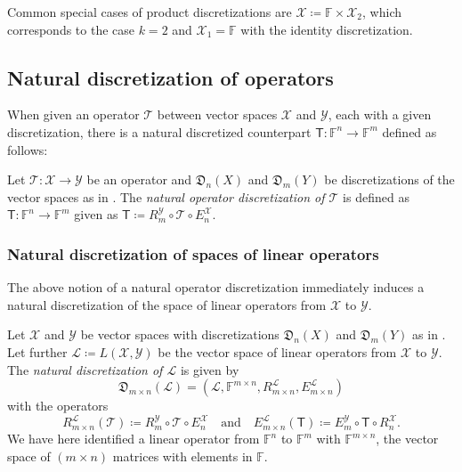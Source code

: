 \documentclass[a4paper]{paper}
\newcommand*{\SPC}[1]{{\ensuremath{\mathscr{#1}}}}
\newcommand*{\SPCL}{\SPC{L}}
\newcommand*{\SPCX}{\SPC{X}}
\newcommand*{\SPCY}{\SPC{Y}}
\newcommand*{\LINOP}[2]{{L(#1, #2)}}
\newcommand{\FIELD}{{\ensuremath{\mathbb{F}}}}
\newcommand*{\Fn}{{\ensuremath{\FIELD^n}}}
\newcommand*{\Fm}{{\ensuremath{\FIELD^m}}}
\newcommand*{\Fmxn}{{\ensuremath{\FIELD^{m \times n}}}}
\newcommand*{\OP}[1]{{\ensuremath{\mathcal{#1}}}}
\newcommand*{\OPT}{\OP{T}}
\newcommand{\DISCOP}[1]{{\ensuremath{\mathsf{#1}}}}
\newcommand*{\DISCOPT}{\DISCOP{T}}
\newcommand*{\EXT}[2]{\ensuremath{E_{#1}^{#2}}}
\newcommand*{\REST}[2]{\ensuremath{R_{#1}^{#2}}}
\newcommand*{\RnX}{{\ensuremath{\REST{n}{\SPC{X}}}}}
\newcommand*{\RmY}{{\ensuremath{\REST{m}{\SPC{Y}}}}}
\newcommand*{\EnX}{{\ensuremath{\EXT{n}{\SPC{X}}}}}
\newcommand*{\EmY}{{\ensuremath{\EXT{m}{\SPC{Y}}}}}
\newcommand*{\DISCR}[2]{{\ensuremath{\mathfrak{D}_{#2}(#1)}}}
\newcommand*{\DISCRnX}{\DISCR{X}{n}}
\newcommand*{\DISCRmY}{\DISCR{Y}{m}}
\DeclareMathOperator{\DEFEQ}{{\coloneqq}}
\begin{document}
%
Common special cases of product discretizations are $\SPCX\DEFEQ \FIELD \times \SPCX_2$, which corresponds to the 
case 
$k=2$ and $\SPCX_1=\FIELD$ with the identity discretization.



\subsection{Natural discretization of operators}
\label{subsec:discr:operator}

When given an operator $\OPT$ between vector spaces $\SPCX$ and $\SPCY$, each with a given discretization, 
there is a natural discretized counterpart $\DISCOPT \colon \Fn \to \Fm$ defined as follows:

\begin{definition}
 \label{def:discr:operator:operator_discr}
 Let $\OPT\colon \SPCX \to \SPCY$ be an operator and $\DISCRnX$ and $\DISCRmY$ be 
 discretizations of the vector spaces as in . The 
 \emph{natural operator discretization of $\OPT$} is defined as $\DISCOPT \colon \Fn \to \Fm$ given as 
 $\DISCOPT \DEFEQ  \RmY \circ \OPT \circ \EnX$.
\end{definition}


\subsubsection{Natural discretization of spaces of linear operators}
\label{subsubsec:discr:operator:linop_space}

The above notion of a natural operator discretization immediately induces a natural discretization of the space of 
linear operators from $\SPCX$ to $\SPCY$.

\begin{definition}
 \label{def:discr:operator:linop_space:linop_space_discr}
 Let $\SPCX$ and $\SPCY$ be vector spaces with discretizations $\DISCRnX$ and $\DISCRmY$ 
 as in . Let further $\SPCL \DEFEQ  \LINOP{\SPCX}{\SPCY}$ be the 
 vector space of linear operators from $\SPCX$ to $\SPCY$. The \emph{natural discretization of $\SPCL$} is 
 given by
 \begin{equation*}
  \DISCR{\SPCL}{m\times n} = \left( \SPCL, \Fmxn, \REST{m\times n}{\SPCL}, \EXT{m\times n}{\SPCL}
  \right)
 \end{equation*}
 with the operators
 \begin{equation*}
  \REST{m\times n}{\SPCL}(\OPT) \DEFEQ  \RmY \circ \OPT \circ \EnX
  \quad\text{and}\quad
  \EXT{m\times n}{\SPCL}(\DISCOPT) \DEFEQ  \EmY \circ \DISCOPT \circ \RnX.
 \end{equation*}
 We have here identified a linear operator from $\Fn$ to $\Fm$ with $\Fmxn$, the vector space 
 of $(m \times n)$ matrices with elements in $\FIELD$.
\end{definition}
\end{document}
